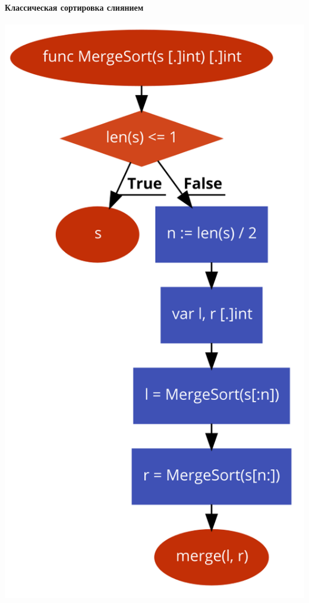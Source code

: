 \documentclass[utf8x, 12pt]{G7-32} %
\begin{document}
\paragraph{Классическая сортировка слиянием}
\begin{center}
	\includegraphics[scale=0.32]{images/mergeSort.png}
\end{center}
\end{document}
